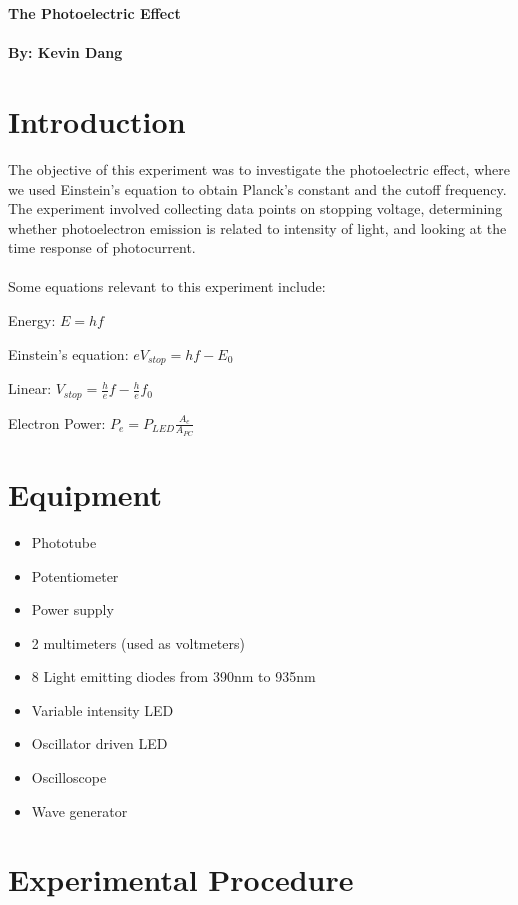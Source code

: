 \documentclass[a4paper, 11pt]{article}
\begin{document}
\noindent
\LARGE\textbf{The Photoelectric Effect} \\
\\
\normalsize \textbf{By: Kevin Dang}



\section*{Introduction}

The objective of this experiment was to investigate the photoelectric effect, where we used Einstein's equation to obtain Planck's constant and the cutoff frequency. The experiment involved collecting data points on stopping voltage, determining whether photoelectron emission is related to intensity of light, and looking at the time response of photocurrent. \\
\\
Some equations relevant to this experiment include:

Energy: $E = hf$

Einstein's equation: $eV_{stop} = hf - E_0$

Linear: $V_{stop} = \frac{h}{e}f - \frac{h}{e}f_0$

Electron Power: $P_e = P_{LED}\frac{A_{e}}{A_{PC}}$


\section*{Equipment}

\begin{itemize}
\item Phototube
\item Potentiometer
\item Power supply
\item 2 multimeters (used as voltmeters)
\item 8 Light emitting diodes from 390nm to 935nm
\item Variable intensity LED
\item Oscillator driven LED
\item Oscilloscope
\item Wave generator
\end{itemize}	


\section*{Experimental Procedure}
\end{document}
